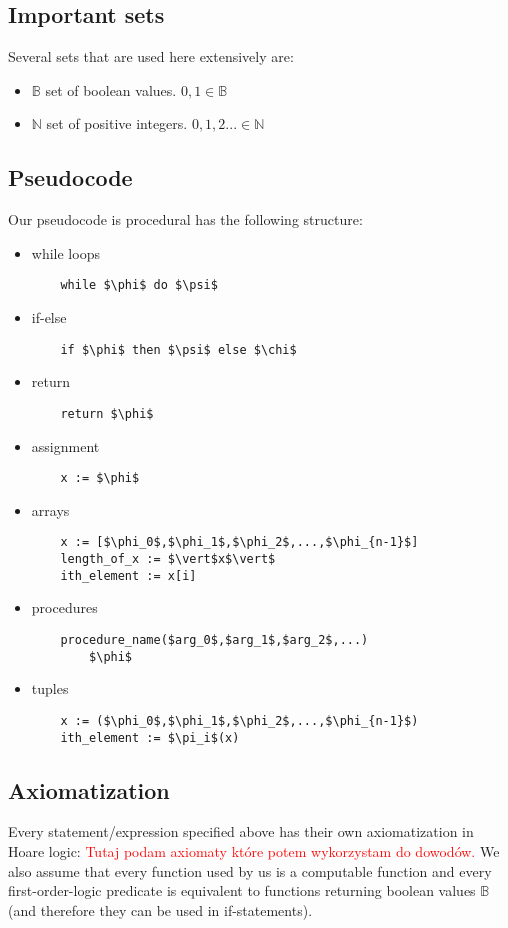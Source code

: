 \documentclass[12pt]{article}
\begin{document}
\subsection{Important sets}
Several sets that are used here extensively are:
\begin{itemize}
	\item $\mathbb{ B}$ set of boolean values. $0,1 \in\mathbb{ B}$ 
	\item $\mathbb{ N}$ set of positive integers. $0,1,2... \in\mathbb{ N}$ 
\end{itemize}
\subsection{Pseudocode}
Our pseudocode is procedural has the following structure:
\begin{itemize}
	\item while loops
	\begin{lstlisting}
	while $\phi$ do $\psi$ 
	\end{lstlisting}
	\item if-else 
	\begin{lstlisting}
	if $\phi$ then $\psi$ else $\chi$ 
	\end{lstlisting}
	\item return
	\begin{lstlisting}
	return $\phi$
	\end{lstlisting}
	\item assignment
    \begin{lstlisting}
	x := $\phi$
	\end{lstlisting}
	\item arrays
	\begin{lstlisting}
	x := [$\phi_0$,$\phi_1$,$\phi_2$,...,$\phi_{n-1}$]
	length_of_x := $\vert$x$\vert$ 
	ith_element := x[i]
	\end{lstlisting}
	\item procedures
	\begin{lstlisting}
	procedure_name($arg_0$,$arg_1$,$arg_2$,...)
		$\phi$
	\end{lstlisting}
	\item tuples
	\begin{lstlisting}
	x := ($\phi_0$,$\phi_1$,$\phi_2$,...,$\phi_{n-1}$)
	ith_element := $\pi_i$(x)
	\end{lstlisting}
\end{itemize}

\subsection{Axiomatization}
Every statement/expression specified above has their own axiomatization in Hoare logic:
 \textcolor{red}{Tutaj podam axiomaty które potem wykorzystam do dowodów.}
 We also assume that every function used by us is a computable function and every first-order-logic predicate is equivalent to functions returning boolean values $\mathbb{ B}$ (and therefore they can be used in if-statements).
\end{document}
